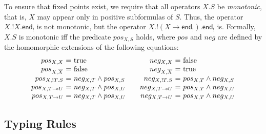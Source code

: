 \documentclass[orivec,envcountsame]{llncs}
\makeatletter
\newcommand{\gvdual}[1]{\overline{#1}}
\newcommand{\gvout}[2]{{!#1.#2}}
\newcommand{\lto}{\ensuremath{\multimap}}
\newcommand{\uto}{\ensuremath{\rightarrow}}
\newcommand{\outterm}{\mkwd{end}_!}
\newcommand{\mkwd}[1]{\mathsf{#1}}
\newcommand{\true}{\mathrm{true}}
\newcommand{\false}{\mathrm{false}}
\newcommand{\ba}{\begin{array}}
\newcommand{\ea}{\end{array}}
\newenvironment{eqs}{\ba{@{}r@{~}c@{~}l@{}}}{\ea}
\makeatother
\begin{document}
To ensure that fixed points exist, we require that all operators $X.S$ be \emph{monotonic}, that is,
$X$ may appear only in positive subformulas of $S$.
Thus, the operator $X.\gvout{X}{\outterm}$ is not monotonic, but the operator $X.\gvout{(X \uto
  \outterm)}{\outterm}$ is.
%
Formally, $X.S$ is monotonic iff the predicate $pos_{X,S}$ holds, where $pos$ and $neg$ are defined
by the homomorphic extensions of the following equations:
\small\[
\ba{@{}c@{\qquad}c@{}}
\begin{eqs}
pos_{X,X}         &=& \true \\
pos_{X,\gvdual{X}}  &=& \false \\
pos_{X,\gvout{T}{S}} &=& neg_{X,T} \wedge pos_{X,S} \\
pos_{X,T \lto U}    &=& neg_{X,T} \wedge pos_{X,U} \\
pos_{X,T \uto U}    &=& neg_{X,T} \wedge pos_{X,U} \\
\end{eqs}
&
\begin{eqs}
neg_{X,X}          &=& \false \\
neg_{X,\gvdual{X}}   &=& \true \\
neg_{X,\gvout{T}{S}} &=& pos_{X,T} \wedge neg_{X,S} \\
neg_{X,T \lto U}    &=& pos_{X,T} \wedge neg_{X,U} \\
neg_{X,T \uto U}    &=& pos_{X,T} \wedge neg_{X,U} \\
\end{eqs}
\ea
\]\normalsize

\subsection{Typing Rules}
\label{sec:mugv-typing}
\end{document}
